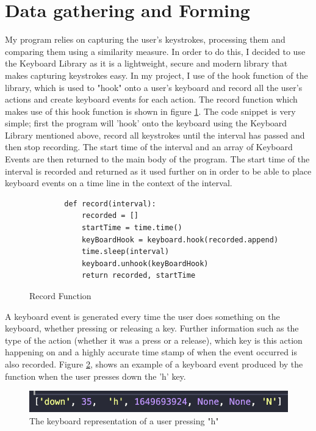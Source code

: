 \documentclass[10pt,a4paper]{report}
\begin{document}
\section{Data gathering and Forming}
My program relies on capturing the user's keystrokes, processing them and comparing them using a similarity measure. In order to do this, I decided to use the Keyboard Library\cite{boppreh_2016} as it is a lightweight, secure and modern library that makes capturing keystrokes easy. In my project, I use of the hook function of the library, which is used to "hook" onto a user's keyboard and record all the user's actions and create keyboard events for each action. The record function which makes use of this hook function is shown in figure \ref{fig:Record}. The code snippet is very simple; first the program will 'hook' onto the keyboard using the Keyboard Library mentioned above, record all keystrokes until the interval has passed and then stop recording. The start time of the interval and an array of Keyboard Events are then returned to the main body of the program. The start time of the interval is recorded and returned as it used further on in order to be able to place keyboard events on a time line in the context of the interval.

\begin{figure}[h!]
	\begin{lstlisting}
		def record(interval):
    		recorded = []
    		startTime = time.time()
    		keyBoardHook = keyboard.hook(recorded.append)
    		time.sleep(interval)
    		keyboard.unhook(keyBoardHook)
    		return recorded, startTime
	\end{lstlisting}
	\caption{Record Function}
	\label{fig:Record}
\end{figure}

A keyboard event is generated every time the user does something on the keyboard, whether pressing or releasing a key. Further information such as the type of the action (whether it was a press or a release), which key is this action happening on and a highly accurate time stamp of when the event occurred is also recorded. Figure \ref{fig:Hook}, shows an example of a keyboard event produced by the function when the user presses down the 'h' key.

\begin{figure}[h]
\centering
\includegraphics[scale=0.97]{KeyboardEvent}
\caption{The keyboard representation of a user pressing "h"}
\label{fig:Hook}
\end{figure}	
\end{document}
